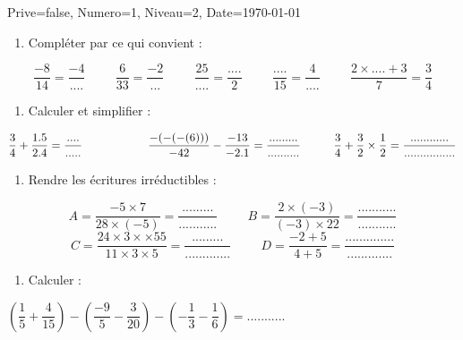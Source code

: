 \documentclass[a4paper,12pt]{article}
\begin{document}
\begin{Maquette}[DM]{Prive=false, Numero=1, Niveau=2, Date=\today}

\begin{exercice}
\begin{enumerate}
\item Compléter par ce qui convient :
\end{enumerate}
\[\dfrac{-8}{14}=\dfrac{-4}{....} \hspace{1cm}
\dfrac{6}{33}=\dfrac{-2}{...}\hspace{1cm}
\dfrac{25}{....}=\dfrac{....}{2} \hspace{1cm}
\dfrac{....}{15}=\dfrac{4}{....}\hspace{1cm}
\dfrac{2\times .... +3}{7}=\dfrac{3}{4}\]

\end{exercice}

\begin{exercice}
\begin{enumerate}
\item Calculer et simplifier :
\end{enumerate}
$\dfrac{3}{4}+\dfrac{1.5}{2.4}=\dfrac{....}{.....}\hspace{2cm}
\dfrac{-(-(-(6)))}{-42}-\dfrac{-13}{-2.1}=\dfrac{.........}{..........}\hspace*{1cm} \dfrac{3}{4}+\dfrac{3}{2}\times \dfrac{1}{2}=\dfrac{............}{................}$
\end{exercice}


\begin{exercice}
\begin{enumerate}
\item Rendre les écritures irréductibles :
\end{enumerate}
\[A=\dfrac{-5\times7}{28\times(-5)} =\dfrac{.........}{...........}\hspace{1cm}
B=\dfrac{2\times(-3)}{(-3)\times22}=\dfrac{...........}{...........}\]
\[C=\dfrac{24\times3\times\times55}{11\times3\times5}=\dfrac{.........}{.............} \hspace{1cm}
D=\dfrac{-2+5}{4+5}=\dfrac{..............}{.............}\]
\end{exercice}

\begin{exercice}
\begin{enumerate}
\item Calculer :
\end{enumerate}
$\left( \dfrac{1}{5}+\dfrac{4}{15}\right) -\left( \dfrac{-9}{5}-\dfrac{3}{20}\right) -\left( -\dfrac{1}{3}-\dfrac{1}{6} \right) = ........... $


\end{exercice}
\end{Maquette}
\end{document}
